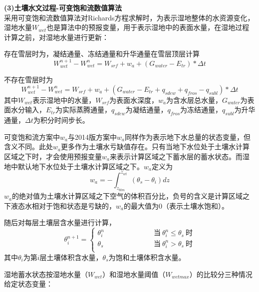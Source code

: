 \textbf {(3)土壤水文过程-可变饱和流数值算法}\\

采用可变饱和流数值算法对Richards方程求解时，为表示湿地整体的水资源变化，湿地水量$W_{wet}$也是算法中的预报变量，用于表示湿地中的表面水量，在湿地过程计算之前，对湿地水量进行更新：

存在雪层时为，凝结通量、冻结通量和升华通量在雪层顶层计算
\begin{equation}
W_{wet}^{n+1}-W_{wet}^{n}=W_{srf}+w_{a}+\left(G_{water}-E_{tr}\right)*{\Delta t}
\end{equation}

不存在雪层时为
\begin{equation}
W_{wet}^{n+1}-W_{wet}^{n}=W_{srf}+w_{a}+\left(G_{water}-E_{tr}+q_{sdew}+q_{fros}-q_{subl}\right)*{\Delta t}
\end{equation}
其中$W_{wet}$表示湿地中的水量，$W_{srf}$为表面水深度，$w_{a}$为含水层总水量，$G_{water}$为表面水分输入，$E_{tr}$为实际蒸腾通量，$q_{sdew}$为凝结通量，$q_{fros}$为冻结通量，$q_{subl}$为升华通量，${\Delta t}$为积分时间步长。

可变饱和流方案中$w_a$与2014版方案中$w_a$同样作为表示地下水总量的状态变量，但含义不同。此处$w_a$更多作为土壤水亏缺值存在。只有当地下水位处于土壤水计算区域之下时，才会使用预报变量$w_a$来表示计算区域之下蓄水层的蓄水状态。而湿地中默认地下水位处于土壤水计算区域之下。$w_a$定义为
\begin{equation}
w_{a}=-\int_{z_{b t m}}^{z_{w t}}\left(\theta_{s}-\theta_{i}\right) d z
\end{equation}
$w_a$的绝对值为土壤水计算区域之下空气的体积百分比，负号的含义是计算区域之下液态水相对于饱和状态是亏缺的，$w_a$的最大值为0（表示土壤水饱和）。

随后对每层土壤层含水量进行计算，
\begin{equation}
    \theta_{i}^{n+1}=\begin{cases}
        \theta_{i}^{n} &\qquad \quad \qquad \quad \;\text{当}\ \theta_{i}^{n} \leqslant \theta_{s} \ \text{时} \\
        \theta_{s}     &\qquad \quad \qquad \quad \;\text{当}\ \theta_{i}^{n} > \theta_{s} \ \text{时} \\
    \end{cases}
\end{equation}
其中$\theta_{i}$为第$i$层土壤体积含水量，$\theta_{s}$为饱和土壤体积含水量。

湿地蓄水状态按湿地水量（$W_{wet}$）和湿地水量阈值（$W_{wetmax}$）的比较分三种情况给定状态变量：

